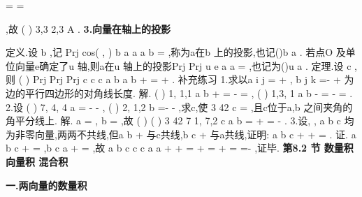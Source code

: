 =
=






\xi \xi \xi \rho 
,故 
(
)
3,3 2,3
A
. 
{\bfseries \textcolor{lyred}{3.向量在轴上的投影}}

\textcolor{lyred}{定义}.设
b \neq 
\rho 
\rho 
,记
\cdot 
Prj
cos( , )
b a
a
a b
=
\rho 
\rho 
\rho 
\rho 
\rho 
,称为a\rho 在b
\rho 
上的\textcolor{lyred}{投影},也记()b
a
\rho 
\rho 
. 
若点O 及单位向量e\rho 确定了u 轴,则a\rho 在u 轴上的\textcolor{lyred}{投影}Prj
Prj
u
e
a
a
=
\rho 
\rho 
\rho ,也记为()u
a\rho 
. 
\textcolor{lyred}{定理}.设
c \neq 
\rho 
\rho 
,则
(
)
Prj
Prj
Prj
c
c
c
a
b
a
b
\lambda 
\mu 
\lambda 
\mu 
+
=
+
\rho 
\rho 
\rho 
\rho 
\rho 
\rho 
\rho 
. 
\textcolor{lyred}{补充练习 }
1.求以a
i
j
=
+
\rho 
\rho 
\rho 
,
b
j
k
=-
+
\rho 
\rho 
\rho 
为边的平行四边形的对角线长度. 
解.
(
)
1, 1,1
a
b
+
=
-
=
\rho 
\rho 
,
(
)
1,3, 1
a
b
-
=
-
=
\rho 
\rho 
. 
2.设
(
)
7, 4, 4
a =
-
-
\rho 
,
(
)
2, 1,2
b =-
-
\rho 
,求c\rho ,使
3 42
c =
\rho 
,且c\rho 位于a\rho ,b
\rho 
之间夹角的 
角平分线上. 
解.
a =
\rho 
,
b =
\rho 
,故
(
)
(
)
3 42
7 1, 7,2
c
a
b
=\pm 
+
=\pm 
-
\rho 
\rho 
\rho 
. 
3.设, ,
a b c
\rho 
\rho 
\rho 均为非零向量,两两不共线,但a
b
+
\rho 
\rho 
与c\rho 共线,b
c
+
\rho 
\rho 与a\rho 共线,证明: 
a
b
c
+
+
=
\rho 
\rho 
\rho 
\rho 
. 
证. a
b
c
\lambda 
+
=
\rho 
\rho 
\rho ,b
c
a
\mu 
+
=
\rho 
\rho 
\rho ,故
a
b
c
c
c
a
a
\lambda 
\mu 
\lambda 
\mu 
+
+
=
+
=
+
\Rightarrow 
=
=-
\rho 
\rho 
\rho 
\rho 
\rho 
\rho 
\rho 
,证毕. 
\vspace{6pt}
{\large \bfseries \textcolor{lyred}{第8.2 节 数量积 向量积 混合积}}

\vspace{4pt}
{\bfseries \textcolor{lyred}{一.两向量的数量积}}

